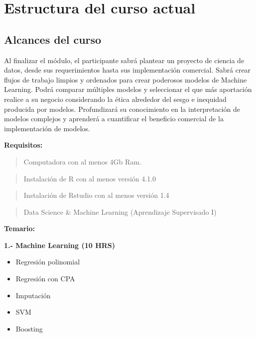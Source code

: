 \documentclass[
]{book}
\providecommand{\tightlist}{%
  \setlength{\itemsep}{0pt}\setlength{\parskip}{0pt}}
\begin{document}
\hypertarget{estructura-del-curso-actual}{%
\section{Estructura del curso actual}\label{estructura-del-curso-actual}}

\hypertarget{alcances-del-curso}{%
\subsection{Alcances del curso}\label{alcances-del-curso}}

Al finalizar el módulo, el participante sabrá plantear un proyecto de ciencia de datos, desde sus requerimientos hasta sus implementación comercial. Sabrá crear flujos de trabajo limpios y ordenados para crear poderosos modelos de Machine Learning. Podrá comparar múltiples modelos y seleccionar el que más aportación realice a su negocio considerando la ética alrededor del sesgo e inequidad producida por modelos. Profundizará su conocimiento en la interpretación de modelos complejos y aprenderá a cuantificar el beneficio comercial de la implementación de modelos.

\textbf{Requisitos:}

\begin{quote}
Computadora con al menos 4Gb Ram.
\end{quote}

\begin{quote}
Instalación de R con al menos versión 4.1.0
\end{quote}

\begin{quote}
Instalación de Rstudio con al menos versión 1.4
\end{quote}

\begin{quote}
Data Science \& Machine Learning (Aprendizaje Supervisado I)
\end{quote}

\textbf{Temario:}

\textbf{1.- Machine Learning (10 HRS)}

\begin{itemize}
\tightlist
\item
  Regresión polinomial
\item
  Regresión con CPA
\item
  Imputación
\item
  SVM
\item
  Boosting
\end{itemize}
\end{document}
